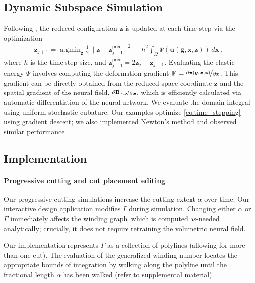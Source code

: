 \subsection{Dynamic Subspace Simulation}
\label{sec:reduced}
Following \citet{chang:2023:licrom}, the reduced configuration $\bm{z}$ is updated at each time step via the optimization
\begin{align} 
\label{eq:time_stepping}
 \bm{z}_{j+1} = \operatorname{argmin}_{\bm{z}} \frac{1}{2} \|\bm{z} - \bm{z}_{j+1}^{\text{pred}} \|^2 + h^2 \int_{\Omega} \Psi\left( \bm{u}(\bm{g}, \bm{x}, \bm{z}) \right) \, d\bm{x} \ ,
\end{align}
where $h$ is the time step size, and $\bm{z}_{j+1}^{\text{pred}} = 2\bm{z}_{j} - \bm{z}_{j-1}$. Evaluating the elastic energy $\Psi$ involves computing the deformation gradient $\mathbf{F} = \nicefrac{\partial \bm{u}(\bm{g}, \bm{x}, \bm{z})}{\partial \bm{x}}$. This gradient can be directly obtained from the reduced-space coordinate $\bm{z}$ and the spatial gradient of the neural field, $\nicefrac{\partial \mathbf{B}_{\bm{x}, \bm{g}}}{\partial \bm{x}}$, which is efficiently calculated via automatic differentiation of the neural network. We evaluate the domain integral using uniform stochastic cubature. Our examples optimize \eqref{eq:time_stepping} using gradient descent; we also implemented Newton's method and observed similar performance.

\subsection{Implementation}

\paragraph{Progressive cutting and cut placement editing}
Our progressive cutting simulations increase the cutting extent $\alpha$ over time. Our interactive design application modifies $\Gamma$ during simulation. Changing either $\alpha$ or $\Gamma$ immediately affects the winding graph, which is computed as-needed analytically; crucially, it does not require retraining the volumetric neural field.

Our implementation represents $\Gamma$ as a collection of polylines (allowing for more than one cut). The evaluation of the generalized winding number locates the appropriate bounds of integration by walking along the polyline until the fractional length $\alpha$ has been walked (refer to supplemental material).

